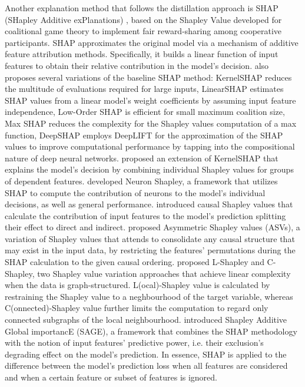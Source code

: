\documentclass[journal]{IEEEtran}
\begin{document}
Another explanation method that follows the distillation approach is SHAP (SHapley Additive exPlanations) \cite{Lundberg2017}, based on the Shapley Value \cite{Roth1988} developed for coalitional game theory to implement fair reward-sharing among cooperative participants. SHAP approximates the original model via a mechanism of additive feature attribution methods. Specifically, it builds a linear function of input features to obtain their relative contribution in the model’s decision. \cite{Lundberg2017} also proposes several variations of the baseline SHAP method: KernelSHAP reduces the multitude of evaluations required for large inputs, LinearSHAP estimates SHAP values from a linear model’s weight coefficients by assuming input feature independence, Low-Order SHAP is efficient for small maximum coalition size, Max SHAP reduces the complexity for the Shapley values computation of a max function, DeepSHAP employs DeepLIFT for the approximation of the SHAP values to improve computational performance by tapping into the compositional nature of deep neural networks. \cite{Aas2021} proposed an extension of KernelSHAP that explains the model's decision by combining individual Shapley values for groups of dependent features. \cite{Ghorbani2020} developed Neuron Shapley, a framework that utilizes SHAP to compute the contribution of neurons to the model's individual decisions, as well as general performance. \cite{Heskes2020} introduced causal Shapley values that calculate the contribution of input features to the model's prediction splitting their effect to direct and indirect. \cite{Frye2019} proposed Asymmetric Shapley values (ASVs), a variation of Shapley values that attends to consolidate any causal structure that may exist in the input data, by restricting the features' permutations during the SHAP calculation to the given causal ordering. \cite{Chen2019a} proposed L-Shapley and C-Shapley, two Shapley value variation approaches that achieve linear complexity when the data is graph-structured. L(ocal)-Shapley value is calculated by restraining the Shapley value to a neghbourhood of the target variable, whereas C(onnected)-Shapley value further limits the computation to regard only connected subgraphs of the local neighbourhood. \cite{Covert2020a} introduced Shapley Additive Global importancE (SAGE), a framework that combines the SHAP methodology with the notion of input features' predictive power, i.e. their exclusion's degrading effect on the model's prediction. In essence, SHAP is applied to the difference between the model's prediction loss when all features are considered and when a certain feature or subset of features is ignored. 
\end{document}

